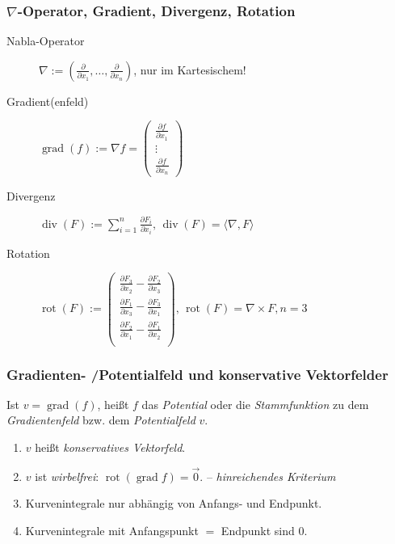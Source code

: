 \documentclass[a4paper, 9pt, DIV=24]{scrartcl}
\DeclareMathOperator{\grad}{grad}
\DeclareMathOperator{\rot}{rot}
\DeclareMathOperator{\Div}{div}
\begin{document}
\subsubsection{$\nabla$-Operator, Gradient, Divergenz, Rotation}
\begin{description}
 \item[Nabla-Operator] $\nabla := (\frac{\partial}{\partial x_1},\dots,\frac{\partial}{\partial x_n})$, nur im Kartesischem!
 \item[Gradient(enfeld)] $\grad(f) := \nabla f = \begin{pmatrix}\frac{\partial f}{\partial x_1} \\\vdots\\ \frac{\partial f}{\partial x_n}\end{pmatrix}$
 \item[Divergenz] $\Div(F) := \sum_{i=1}^n\frac{\partial F_i}{\partial x_i},\, \Div(F) = \langle \nabla, F \rangle$
 \item[Rotation] $\rot(F) := \begin{pmatrix}
\frac{\partial F_3}{\partial x_2} - \frac{\partial F_2}{\partial x_3} \\
\frac{\partial F_1}{\partial x_3} - \frac{\partial F_3}{\partial x_1} \\
\frac{\partial F_2}{\partial x_1} - \frac{\partial F_1}{\partial x_2} \\
\end{pmatrix},\, \rot(F) = \nabla \times F, n = 3$
\end{description}

\subsubsection{Gradienten- /Potentialfeld und konservative Vektorfelder}
Ist $v = \grad(f)$, heißt $f$ das \emph{Potential} oder die \emph{Stammfunktion} zu dem \emph{Gradientenfeld} bzw. dem \emph{Potentialfeld} $v$.
\begin{enumerate}[label={(}\arabic*{)}]
 \item $v$ heißt \emph{konservatives Vektorfeld}.
 \item $v$ ist \emph{wirbelfrei}: $\rot(\grad f) = \vec{0}$. -- \emph{hinreichendes Kriterium}
 \item Kurvenintegrale nur abhängig von Anfangs- und Endpunkt.
 \item Kurvenintegrale mit Anfangspunkt $=$ Endpunkt sind $0$.
\end{enumerate}
\end{document}
